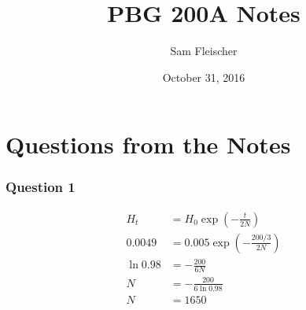 \documentclass{article}
\title{PBG 200A Notes}
\author{Sam Fleischer}
\date{October 31, 2016}
\begin{document}
    \maketitle

    \section{Questions from the Notes}
        \subsubsection*{Question 1}
            \begin{align*}
                H_t &= H_0\exp(-\frac{t}{2N}) \\
                0.0049 &= 0.005\exp(-\frac{200/3}{2N}) \\
                \ln0.98 &= -\frac{200}{6N} \\
                N &= -\frac{200}{6\ln0.98} \\
                N &= 1650
            \end{align*}
\end{document}
